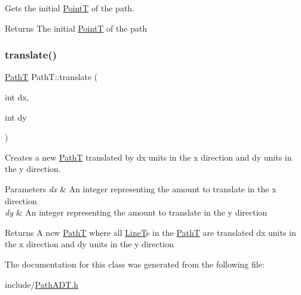 Gets the initial \mbox{\hyperlink{class_point_t}{PointT}} of the path. 

\begin{DoxyReturn}{Returns}
The initial \mbox{\hyperlink{class_point_t}{PointT}} of the path 
\end{DoxyReturn}
\mbox{\label{class_path_t_a4fad10e40e0a0da2b5343b6105f5d9c7}} 
\subsubsection{\texorpdfstring{translate()}{translate()}}
{\footnotesize\ttfamily \mbox{\hyperlink{class_path_t}{PathT}} Path\+T\+::translate (\begin{DoxyParamCaption}\item[{int}]{dx,  }\item[{int}]{dy }\end{DoxyParamCaption})}



Creates a new \mbox{\hyperlink{class_path_t}{PathT}} translated by dx units in the x direction and dy units in the y direction. 


\begin{DoxyParams}{Parameters}
{\em dx} & An integer representing the amount to translate in the x direction \\
\hline
{\em dy} & An integer representing the amount to translate in the y direction \\
\hline
\end{DoxyParams}
\begin{DoxyReturn}{Returns}
A new \mbox{\hyperlink{class_path_t}{PathT}} where all \mbox{\hyperlink{class_line_t}{LineT}}\textquotesingle{}s in the \mbox{\hyperlink{class_path_t}{PathT}} are translated dx units in the x direction and dy units in the y direction 
\end{DoxyReturn}


The documentation for this class was generated from the following file\+:\begin{DoxyCompactItemize}
\item 
include/\mbox{\hyperlink{_path_a_d_t_8h}{Path\+A\+D\+T.\+h}}\end{DoxyCompactItemize}
